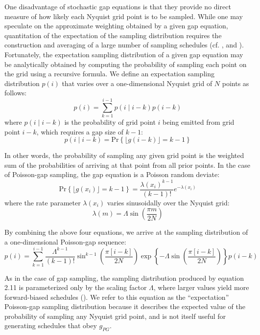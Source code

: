 \begin{doublespace}
One disadvantage of stochastic gap equations is that they provide no direct
measure of how likely each Nyquist grid point is to be sampled. While one may
speculate on the approximate weighting obtained by a given gap equation,
quantitation of the expectation of the sampling distribution requires the
construction and averaging of a large number of sampling schedules
(cf. ,  and ).
Fortunately, the expectation sampling distribution of a given gap equation
may be analytically obtained by computing the probability of sampling each
point on the grid using a recursive formula. We define an expectation
sampling distribution $p(i)$ that varies over a one-dimensional Nyquist
grid of $N$ points as follows:
\begin{equation}
p(i) = \sum_{k=1}^{i-1} p(i \mid i-k) p(i-k)
\end{equation}
where $p(i \mid i-k)$ is the probability of grid point $i$ being emitted from
grid point $i-k$, which requires a gap size of $k-1$:
\begin{equation}
p(i \mid i-k) = \mathrm{Pr}\left\{
 \lfloor g(i-k) \rfloor = k - 1
\right\}
\end{equation}

In other words, the probability of sampling any given grid point is the
weighted sum of the probabilities of arriving at that point from all prior
points. In the case of Poisson-gap sampling, the gap equation is a Poisson
random deviate:
\begin{equation}
\mathrm{Pr}\left\{ \lfloor g(x_i) \rfloor = k - 1 \right\} =
 \frac{\lambda(x_i)^{k-1}}{(k-1)!} e^{-\lambda(x_i)}
\end{equation}
where the rate parameter $\lambda(x_i)$ varies sinusoidally over the Nyquist
grid:
\begin{equation}
\lambda(m) = \Lambda \sin \left( \frac{\pi m}{2 N} \right)
\end{equation}

By combining the above four equations, we arrive at the sampling distribution
of a one-dimensional Poisson-gap sequence:
\begin{equation}
p(i) = \sum_{k=1}^{i-1} \frac{\Lambda^{k-1}}{(k-1)!}
 \sin^{k-1} \left( \frac{\pi [i-k]}{2 N} \right)
 \exp\left\{
  -\Lambda \sin \left( \frac{\pi [i-k]}{2 N} \right)
 \right\}
p(i-k)
\end{equation}

As in the case of gap sampling, the sampling distribution produced by equation
2.11 is parameterized only by the scaling factor $\Lambda$, where larger values
yield more forward-biased schedules (). We refer
to this equation as the ``expectation'' Poisson-gap sampling distribution
because it describes the expected value of the probability of sampling any
Nyquist grid point, and is not itself useful for generating schedules that
obey $g_{PG}$.
\end{doublespace}


